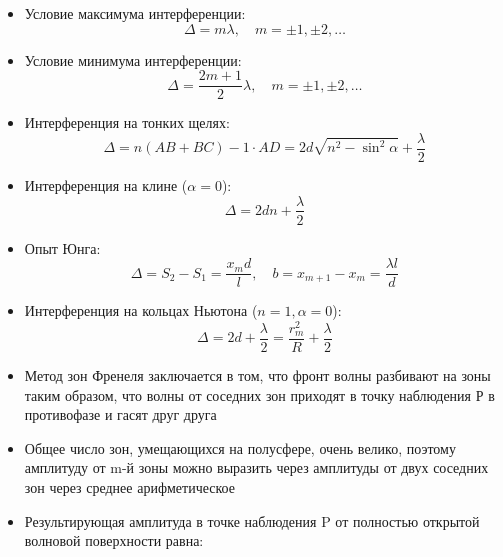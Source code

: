 \documentclass[twoside, a4paperpt, fleqn]{extarticle}
\begin{document}
\begin{multicols}{2}
\begin{itemize}
            \item Условие максимума интерференции:
            \begin{equation*}
                \Delta = m \lambda, \quad m = \pm 1, \pm 2, \dots
            \end{equation*}
            \item Условие минимума интерференции:
            \begin{equation*}
                \Delta = \frac{2m+1}{2} \lambda, \quad m = \pm 1, \pm 2, \dots
            \end{equation*}
            \item Интерференция на тонких щелях:
            \begin{equation*}
                \Delta = n(AB + BC) - 1 \cdot AD = 2d \sqrt{n^2-\sin^2 \alpha} + \frac{\lambda}{2}
            \end{equation*}
            \item Интерференция на клине ($\alpha = 0$):
            \begin{equation*}
                \Delta = 2 d n + \frac{\lambda}{2}
            \end{equation*}
            \item Опыт Юнга:
            \begin{equation*}
                \Delta = S_2 - S_1 = \frac{x_m d}{l}, \quad b = x_{m+1} - x_{m} = \frac{\lambda l}{d}
            \end{equation*}
            \item Интерференция на кольцах Ньютона ($n=1, \alpha = 0$):
            \begin{equation*}
                \Delta = 2d + \frac{\lambda}{2} = \frac{r_m^2}{R} + \frac{\lambda}{2}
            \end{equation*}
            \item Метод зон Френеля
            заключается в том, что фронт волны разбивают на зоны таким 
            образом, что волны от соседних зон приходят в точку наблюдения 
            Р в противофазе и гасят друг друга
            \item Общее число зон, умещающихся на полусфере, очень 
            велико, поэтому амплитуду от m-й зоны можно выразить через 
            амплитуды от двух соседних зон через среднее арифметическое
            \item Результирующая амплитуда в точке наблюдения P от полностью 
            открытой волновой поверхности равна:
            \begin{align*}

\end{align*}
\end{itemize}
\end{multicols}
\end{document}
